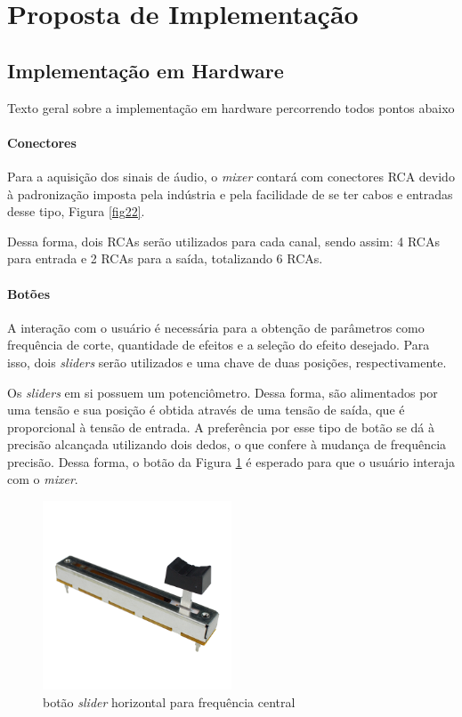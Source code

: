     \section{Proposta de Implementação}


    \subsection{Implementação em Hardware}

    Texto geral sobre a implementação em hardware percorrendo todos pontos abaixo

    \paragraph{Conectores}
    Para a aquisição dos sinais de áudio, o \textit{mixer} contará com conectores RCA devido à padronização imposta pela indústria e pela facilidade de se ter cabos e entradas desse tipo, Figura \ref{fig22}.

    Dessa forma, dois RCAs serão utilizados para cada canal, sendo assim: 4 RCAs para entrada e 2 RCAs para a saída, totalizando 6 RCAs.

    \paragraph{Botões}

    A interação com o usuário é necessária para a obtenção de parâmetros como frequência de corte, quantidade de efeitos e a seleção do efeito desejado. Para isso, dois \textit{sliders} serão utilizados e uma chave de duas posições, respectivamente. 

    Os \textit{sliders} em si possuem um potenciômetro. Dessa forma, são alimentados por uma tensão e sua posição é obtida através de uma tensão de saída, que é proporcional à tensão de entrada. A preferência por esse tipo de botão se dá à precisão alcançada utilizando dois dedos, o que confere à mudança de frequência precisão. Dessa forma, o botão da Figura \ref{fig61} é esperado para que o usuário interaja com o \textit{mixer}. 
    
    \begin{figure}[h]
        \centering
        \includegraphics[width=0.5\textwidth]{figuras/fig61.png}
        \caption{botão \textit{slider} horizontal para frequência central}
        \label{fig61}
    \end{figure}

